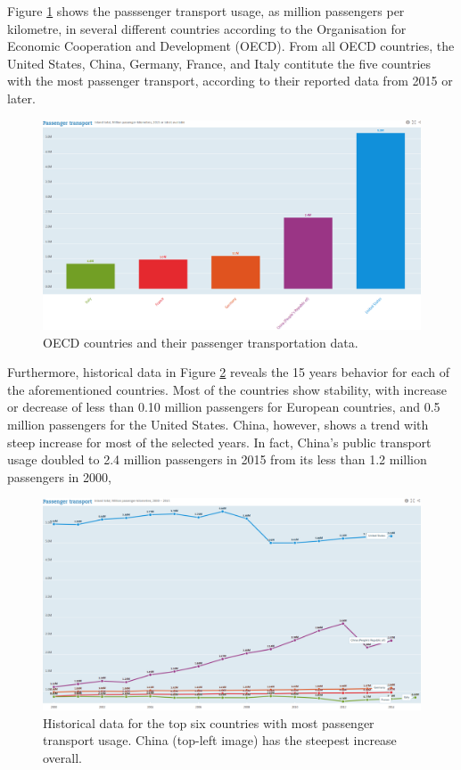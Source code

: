 \documentclass{article}
\begin{document}
Figure \ref{fig:transportation/passenger} shows the passsenger transport usage, as million passengers per kilometre, in several different countries according to the Organisation for Economic Cooperation and Development (OECD). From all OECD countries, the United States, China, Germany, France, and Italy contitute the five countries with the most passenger transport, according to their reported data from 2015 or later.\cite{OECD2017passenger} 

\begin{figure}[H]
  	\centering
  	\includegraphics[width=\linewidth]{./images/OECD_passengers_absolute.png}
  	\caption{OECD countries and their passenger transportation data.}
  	\label{fig:transportation/passenger}
\end{figure}

Furthermore, historical data in Figure \ref{fig:transportation/passenger-trend} reveals the 15 years behavior for each of the aforementioned countries. Most of the countries show stability, with increase or decrease of less than 0.10 million passengers for European countries, and 0.5 million passengers for the United States. China, however, shows a trend with steep increase for most of the selected years. In fact, China's public transport usage doubled to 2.4 million passengers in 2015 from its less than 1.2 million passengers in 2000, 
  
\begin{figure}
  	\centering
  	\includegraphics[width=\linewidth]{./images/OECD_passengers_increase.png}
  	\caption{Historical data for the top six countries with most passenger transport usage. China (top-left image) has the steepest increase overall.}
  	\label{fig:transportation/passenger-trend}
\end{figure}
\end{document}

